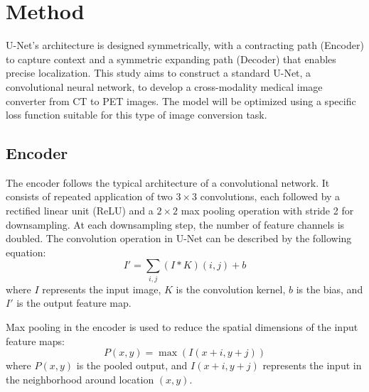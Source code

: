 \documentclass[twocolumn]{article}
\begin{document}



\section{Method}
U-Net's architecture is designed symmetrically, with a contracting path (Encoder) to capture context and a symmetric expanding path (Decoder) that enables precise localization. This study aims to construct a standard U-Net, a convolutional neural network, to develop a cross-modality medical image converter from CT to PET images. The model will be optimized using a specific loss function suitable for this type of image conversion task.

\subsection{Encoder}
The encoder follows the typical architecture of a convolutional network. It consists of repeated application of two $3\times3$ convolutions, each followed by a rectified linear unit (ReLU) and a $2\times2$ max pooling operation with stride 2 for downsampling. At each downsampling step, the number of feature channels is doubled. The convolution operation in U-Net can be described by the following equation:
\[
	I' = \sum_{i,j} (I * K)(i,j) + b
\]
where \(I\) represents the input image, \(K\) is the convolution kernel, \(b\) is the bias, and \(I'\) is the output feature map.

Max pooling in the encoder is used to reduce the spatial dimensions of the input feature maps:
\[
	P(x,y) = \max(I(x + i, y + j))
\]
where \(P(x,y)\) is the pooled output, and \(I(x + i, y + j)\) represents the input in the neighborhood around location \((x, y)\).
\end{document}
